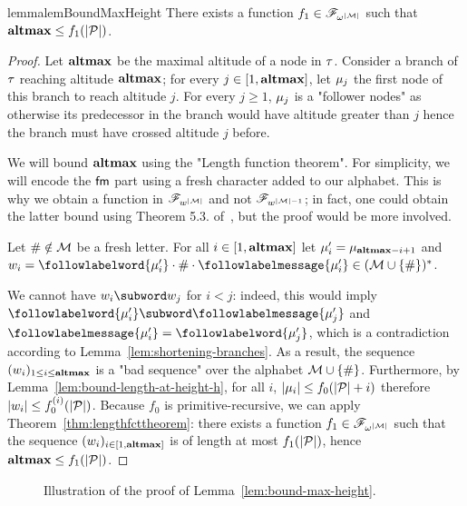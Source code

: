 \begin{restatable}{lemma}{lemBoundMaxHeight}
	\label{lem:bound-max-height}
	There exists a function $f_1 \in \mathscr{F}_{\omega^{|\mathcal{M}|}}$ such that $\mathbf{altmax} \leq f_1(|\mathcal{P}|)$.
\end{restatable}
\begin{proof}
	Let $\mathbf{altmax}$ be the maximal altitude of a node in $\tau$. Consider a branch of $\tau$ reaching altitude $\mathbf{altmax}$; for every $j \in [1,\mathbf{altmax}]$, let $\mu_j$ the first node of this branch to reach altitude $j$. For every $j \geq 1$, $\mu_j$ is a "follower nodes" as otherwise its predecessor in the branch would have altitude greater than $j$ hence the branch must have crossed altitude $j$ before.
	
	We will bound $\mathbf{altmax}$ using the "Length function theorem". For simplicity, we will encode the $\mathsf{fm}$ part using a fresh character added to our alphabet. This is why we obtain a function in $\mathscr{F}_{w^{|\mathcal{M}|}}$ and not $\mathscr{F}_{w^{|\mathcal{M}|-1}}$; in fact, one could obtain the latter bound using Theorem 5.3. of~\cite{SchmitzS2011upperHigman}, but the proof would be more involved.

	Let $\# \notin \mathcal{M}$ be a fresh letter. For all $i \in [1,\mathbf{altmax}]$ let $\mu'_i = \mu_{\mathbf{altmax} - i+1}$ and $w_i = \followlabelword{\node'_{i}} \cdot \# \cdot \followlabelmessage{\node'_{i}} \in (\messages \cup \set{\#})^*$.
	
	We cannot have $w_{i}\subword w_{j}$ for $i< j$: indeed, this would imply $\followlabelword{\node'_{i}} \subword \followlabelmessage{\node'_{j}}$ and $\followlabelmessage{\node'_{i}} = \followlabelword{\node'_{j}}$, which is a contradiction according to Lemma~\ref{lem:shortening-branches}.
	As a result, the sequence $(w_i)_{1\leq i \leq \mathbf{altmax}}$ is a "bad sequence" over the alphabet $\mathcal{M}\cup\{\#\}$.
	Furthermore, by Lemma~\ref{lem:bound-length-at-height-h}, for all $i$, $|\mu_{i}| \leq f_0(|\mathcal{P}| + i)$ therefore $|w_i| \leq f_0^{(i)}(|\mathcal{P}|)$.
	Because $f_0$ is primitive-recursive, we can apply Theorem~\ref{thm:lengthfcttheorem}: there exists a function $f_1 \in \mathscr{F}_{\omega^{|\mathcal{M}|}}$ such that the sequence $(w_i)_{i \in [1,\mathbf{altmax}]}$ is of length at most $f_1(|\mathcal{P}|)$, hence $\mathbf{altmax} \leq f_1(|\mathcal{P}|)$. 
\end{proof}
\begin{figure}[h]
	
	\caption{Illustration of the proof of Lemma~\ref{lem:bound-max-height}.}
	\label{fig:max-height-bound}
\end{figure}

